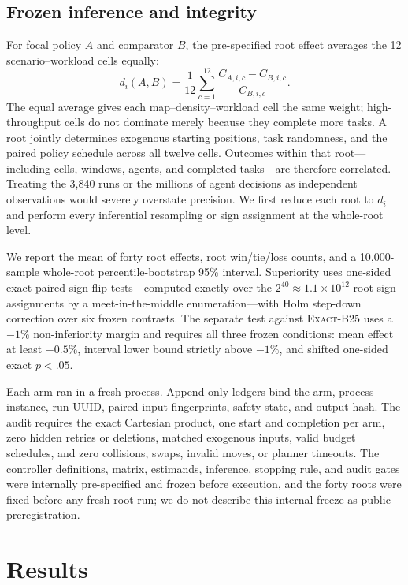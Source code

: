\documentclass[sigconf,review,anonymous]{acmart}
\newcommand{\exactdense}{\textsc{Exact-B25}\xspace}
\begin{document}
\subsection{Frozen inference and integrity}

For focal policy $A$ and comparator $B$, the pre-specified root effect averages
the 12 scenario--workload cells equally:
\begin{equation}
 d_i(A,B)=\frac{1}{12}\sum_{c=1}^{12}
 \frac{C_{A,i,c}-C_{B,i,c}}{C_{B,i,c}}.
\end{equation}
The equal average gives each map--density--workload cell the same weight;
high-throughput cells do not dominate merely because they complete more
tasks. A root jointly determines exogenous starting positions, task randomness,
and the paired policy schedule across all twelve cells. Outcomes within that
root---including cells, windows, agents, and completed tasks---are therefore
correlated. Treating the 3,840 runs or the millions of agent decisions as
independent observations would severely overstate precision. We first reduce
each root to $d_i$ and perform every inferential resampling or sign assignment
at the whole-root level.

We report the mean of forty root effects, root win/tie/loss counts, and a
10,000-sample whole-root percentile-bootstrap 95\% interval. Superiority uses
one-sided exact paired sign-flip tests---computed exactly over the
$2^{40}\approx1.1\times10^{12}$ root sign assignments by a meet-in-the-middle
enumeration---with Holm step-down correction over six frozen contrasts. The
separate test against \exactdense uses a $-1\%$ non-inferiority margin and
requires all three frozen conditions: mean effect at least $-0.5\%$, interval
lower bound strictly above $-1\%$, and shifted one-sided exact $p<.05$.

Each arm ran in a fresh process. Append-only ledgers bind the arm, process
instance, run UUID, paired-input fingerprints, safety state, and output hash.
The audit requires the exact Cartesian product, one start and completion per
arm, zero hidden retries or deletions, matched exogenous inputs, valid budget
schedules, and zero collisions, swaps, invalid moves, or planner timeouts.
The controller definitions, matrix, estimands, inference, stopping
rule, and audit gates were internally pre-specified and frozen before
execution, and the forty roots were fixed before any fresh-root run; we do not
describe this internal freeze as public preregistration.

\section{Results}
\end{document}
